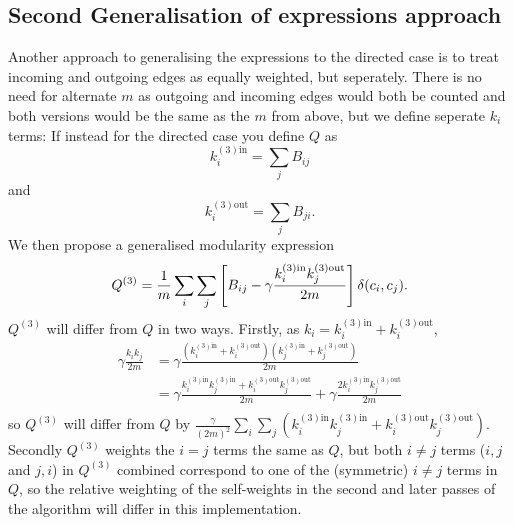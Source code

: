 \documentclass{article}
\begin{document}
\subsection{Second Generalisation of expressions approach}

Another approach to generalising the expressions to the directed case is to treat 
incoming and outgoing edges as equally weighted, but seperately.
There is no need for alternate $m$ as outgoing and incoming edges would both be 
counted and both versions would be the same as the $m$ from above, but we define 
seperate $k_i$ terms:
If instead for the directed case you define $Q$ as 
\newcommand{\dkin}[1]{k_{#1}^{(3)\text{in}}}
\newcommand{\dkout}[1]{k_{#1}^{(3)\text{out}}}
\begin{equation}
\dkin{i} = \sum_j{B_{ij}}
\end{equation}
and
\begin{equation}
\dkout{i} = \sum_j{B_{ji}}.
\end{equation}
We then propose a generalised modularity expression
\begin{equation}
Q^{(3)} = \frac{1}{m}\sum_i\sum_j\left[ B_{ij} - \gamma \frac{\dkin{i}\dkout{j}}{2m} \right] \delta(c_i,c_j). \\
\end{equation}
$Q^{(3)}$ will differ from $Q$ in two ways.
Firstly, as $k_i = \dkin{i} + \dkout{i}$, 
\begin{align*}
\gamma \frac{k_i k_j}{2m} &= \gamma \frac{(\dkin{i} + \dkout{i}) (\dkin{j} + \dkout{j})}{2m} \\
 &= \gamma \frac{\dkin{i}\dkin{j} + \dkout{i}\dkout{j}}{2m} + \gamma \frac{2\dkin{i}\dkout{j}}{2m} \\
\end{align*}
so $Q^{(3)}$ will differ from $Q$ by $\frac{\gamma}{(2m)^2}\sum_i\sum_j (\dkin{i}\dkin{j} + \dkout{i}\dkout{j})$.
Secondly $Q^{(3)}$ weights the $i=j$ terms the same as $Q$, but both $i \neq j$ terms ($i,j$ and $j,i$)
in $Q^{(3)}$ combined correspond to one of the (symmetric) $i \neq j$ terms in $Q$, so the 
relative weighting of the self-weights in the second and later passes of the algorithm will differ in
this implementation. 
\end{document}
